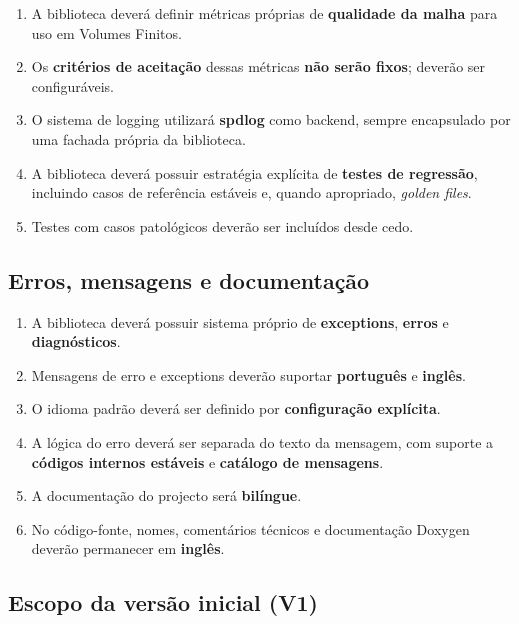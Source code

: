 \begin{enumerate}
    \item A biblioteca deverá definir métricas próprias de \textbf{qualidade da malha} para uso em Volumes Finitos.
    \item Os \textbf{critérios de aceitação} dessas métricas \textbf{não serão fixos}; deverão ser configuráveis.
    \item O sistema de logging utilizará \textbf{spdlog} como backend, sempre encapsulado por uma fachada própria da biblioteca.
    \item A biblioteca deverá possuir estratégia explícita de \textbf{testes de regressão}, incluindo casos de referência estáveis e, quando apropriado, \textit{golden files}.
    \item Testes com casos patológicos deverão ser incluídos desde cedo.
\end{enumerate}

\subsection{Erros, mensagens e documentação}

\begin{enumerate}
    \item A biblioteca deverá possuir sistema próprio de \textbf{exceptions}, \textbf{erros} e \textbf{diagnósticos}.
    \item Mensagens de erro e exceptions deverão suportar \textbf{português} e \textbf{inglês}.
    \item O idioma padrão deverá ser definido por \textbf{configuração explícita}.
    \item A lógica do erro deverá ser separada do texto da mensagem, com suporte a \textbf{códigos internos estáveis} e \textbf{catálogo de mensagens}.
    \item A documentação do projecto será \textbf{bilíngue}.
    \item No código-fonte, nomes, comentários técnicos e documentação Doxygen deverão permanecer em \textbf{inglês}.
\end{enumerate}

\subsection{Escopo da versão inicial (V1)}

